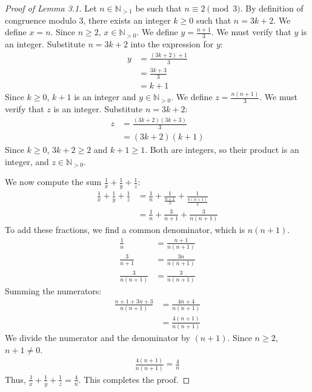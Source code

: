 \documentclass[11pt,a4paper]{article}
\begin{document}
\begin{proof}[Proof of Lemma 3.1]
Let $n \in \mathbb{N}_{>1}$ be such that $n \equiv 2 \pmod 3$.
By definition of congruence modulo 3, there exists an integer $k \geq 0$ such that $n = 3k + 2$.
We define $x = n$. Since $n \geq 2$, $x \in \mathbb{N}_{>0}$.
We define $y = \frac{n+1}{3}$.
We must verify that $y$ is an integer.
Substitute $n = 3k + 2$ into the expression for $y$:
\begin{align*}
y &= \frac{(3k + 2) + 1}{3} \\
  &= \frac{3k + 3}{3} \\
  &= k + 1
\end{align*}
Since $k \geq 0$, $k+1$ is an integer and $y \in \mathbb{N}_{>0}$.
We define $z = \frac{n(n+1)}{3}$.
We must verify that $z$ is an integer.
Substitute $n = 3k + 2$:
\begin{align*}
z &= \frac{(3k+2)(3k+3)}{3} \\
  &= (3k+2)(k+1)
\end{align*}
Since $k \geq 0$, $3k+2 \geq 2$ and $k+1 \geq 1$. Both are integers, so their product is an integer, and $z \in \mathbb{N}_{>0}$.

We now compute the sum $\frac{1}{x} + \frac{1}{y} + \frac{1}{z}$:
\begin{align*}
\frac{1}{x} + \frac{1}{y} + \frac{1}{z} &= \frac{1}{n} + \frac{1}{\frac{n+1}{3}} + \frac{1}{\frac{n(n+1)}{3}} \\
&= \frac{1}{n} + \frac{3}{n+1} + \frac{3}{n(n+1)}
\end{align*}
To add these fractions, we find a common denominator, which is $n(n+1)$.
\begin{align*}
\frac{1}{n} &= \frac{n+1}{n(n+1)} \\
\frac{3}{n+1} &= \frac{3n}{n(n+1)} \\
\frac{3}{n(n+1)} &= \frac{3}{n(n+1)}
\end{align*}
Summing the numerators:
\begin{align*}
\frac{n+1 + 3n + 3}{n(n+1)} &= \frac{4n + 4}{n(n+1)} \\
&= \frac{4(n+1)}{n(n+1)}
\end{align*}
We divide the numerator and the denominator by $(n+1)$. Since $n \geq 2$, $n+1 \neq 0$.
\begin{align*}
\frac{4(n+1)}{n(n+1)} = \frac{4}{n}
\end{align*}
Thus, $\frac{1}{x} + \frac{1}{y} + \frac{1}{z} = \frac{4}{n}$.
This completes the proof.
\end{proof}
\end{document}
